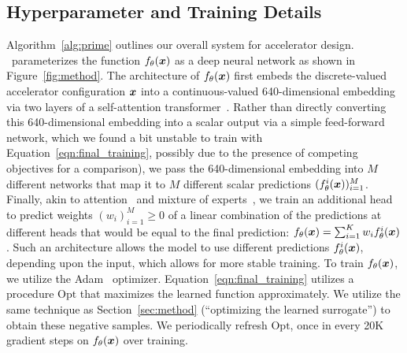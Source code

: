 \subsection{Hyperparameter and Training Details}
\label{sec:practical_implementation}
%
Algorithm~\ref{alg:prime} outlines our overall system for accelerator design.
%
\primemethodname\ parameterizes the function $f_\theta({\boldsymbol{x}})$ as a deep neural network as shown in Figure~\ref{fig:method}. 
%
The architecture of $f_\theta({\boldsymbol{x}})$ first embeds the discrete-valued accelerator configuration ${\boldsymbol{x}}$ into a continuous-valued 640-dimensional embedding via two layers of a self-attention transformer~\citep{vaswani2017attention}. 
%
Rather than directly converting this 640-dimensional embedding into a scalar output via a simple feed-forward network, which we found a bit unstable to train with Equation~\ref{eqn:final_training}, possibly due to the presence of competing objectives for a comparison), we pass the 640-dimensional embedding into $M$ different networks that map it to $M$ different scalar predictions $(f^i_\theta({\boldsymbol{x}}))_{i=1}^M$. 
%
Finally, akin to attention~\citep{vaswani2017attention} and mixture of experts~\citep{shazeer2017outrageously}, we train an additional head to predict weights $(w_i)_{i=1}^M \geq 0$ of a linear combination of the predictions at different heads that would be equal to the final prediction: $f_\theta({\boldsymbol{x}}) = \sum_{i=1}^K w_i f^i_\theta({\boldsymbol{x}})$.
%
Such an architecture allows the model to use different predictions $f^i_\theta({\boldsymbol{x}})$, depending upon the input, which allows for more stable training. To train $f_\theta({\boldsymbol{x}})$, we utilize the Adam~\citep{kingma2014adam} optimizer.
%
Equation~\ref{eqn:final_training} utilizes a procedure $\mathrm{Opt}$ that maximizes the learned function approximately. We utilize the same technique as Section~\ref{sec:method} (``optimizing the learned surrogate'') to obtain these negative samples.
%
We periodically refresh $\mathrm{Opt}$, once in every 20K gradient steps on $f_\theta({\boldsymbol{x}})$ over training.
